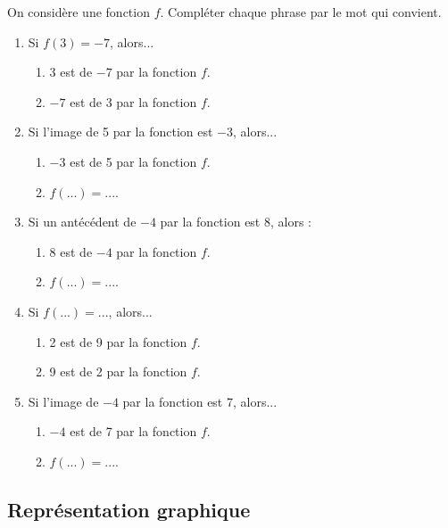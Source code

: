 {\begin{Exercice}%
On considère une fonction \( f \). Compléter chaque phrase par le mot qui convient.
\begin{enumerate}
    \item Si \( f(3) = -7 \), alors...
    \begin{enumerate}
        \item 3 est \phantom{un antécédent} de $ -7 $ par la fonction \( f \).
        \item $ -7 $ est \phantom{l'image} de 3 par la fonction \( f \).
    \end{enumerate}
    \item Si l'image de 5 par la fonction est $ -3 $, alors...
    \begin{enumerate}
        \item $ -3 $ est \phantom{l'image} de 5 par la fonction \( f \).
        \item \( f(...) = ... \).
    \end{enumerate}
    \item Si un antécédent de $ -4 $ par la fonction est 8, alors :
    \begin{enumerate}
        \item 8 est \phantom{un antécédent} de $ -4 $ par la fonction \( f \).
        \item \( f(...) = ... \).
    \end{enumerate}
    \item Si \( f(...) = ... \), alors...
    \begin{enumerate}
        \item 2 est \phantom{un antécédent} de 9 par la fonction \( f \).
        \item 9 est \phantom{l'image} de 2 par la fonction \( f \).
    \end{enumerate}
    \item Si l'image de $ -4 $ par la fonction est 7, alors...
    \begin{enumerate}
        \item $ -4 $ est \phantom{un antécédent} de 7 par la fonction \( f \).
        \item \( f(...) = ... \).
    \end{enumerate}
\end{enumerate}
\vspace{-0.5cm}
\end{Exercice}

\newpage

\subsection*{Représentation graphique}


}
